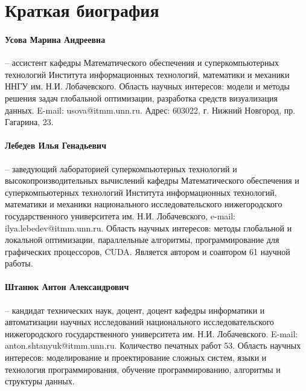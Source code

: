 \documentclass[a4paper,12pt,russian]{article}
\begin{document}
\begin{enumerate}




\end{enumerate}


\section*{Краткая биография}
\paragraph{Усова Марина Андреевна} -- ассистент кафедры Математического обеспечения и суперкомпьютерных технологий Института информационных технологий, математики и механики ННГУ им. Н.И. Лобачевского. Область научных интересов: модели и методы решения задач глобальной оптимизации, разработка средств визуализация данных. E-mail: usova@itmm.unn.ru. Адрес: 603022, г. Нижний Новгород, пр. Гагарина, 23.
\paragraph{Лебедев Илья Генадьевич} -- заведующий лабораторией суперкомпьютерных технологий и высокопроизводительных вычислений кафедры Математического обеспечения и суперкомпьютерных технологий Института информационных технологий, математики и механики национального исследовательского нижегородского государственного университета им. Н.И. Лобачевского, e-mail: ilya.lebedev@itmm.unn.ru. Область научных интересов: методы глобальной и локальной оптимизации, параллельные алгоритмы, программирование для графических процессоров, CUDA. Является автором и соавтором 61 научной работы.
\paragraph{Штанюк Антон Александрович} -- кандидат технических наук, доцент, доцент кафедры информатики и автоматизации научных исследований национального исследовательского нижегородского государственного университета им. Н.И. Лобачевского. E-mail: anton.shtanyuk@itmm.unn.ru. Количество печатных работ 53. Область научных интересов: моделирование и проектирование сложных систем, языки и технология программирования, обучение программированию, алгоритмы и структуры данных.
\end{document}
